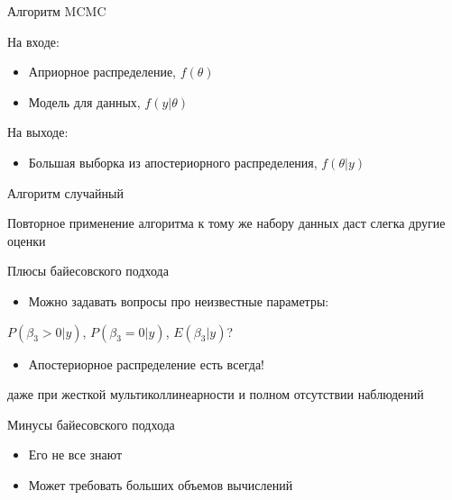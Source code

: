 \documentclass[ignorenonframetext,]{beamer}
\begin{document}
\begin{frame}{Алгоритм MCMC}

На входе:

\begin{itemize}
\item
  Априорное распределение, \(f(\theta)\)
\item
  Модель для данных, \(f(y|\theta)\)
\end{itemize}

На выходе:

\begin{itemize}
\itemsep1pt\parskip0pt
\item
  Большая выборка из апостериорного распределения, \(f(\theta|y)\)
\end{itemize}

\end{frame}

\begin{frame}{Алгоритм случайный}

Повторное применение алгоритма к тому же набору данных даст слегка
другие оценки

\end{frame}

\begin{frame}{Плюсы байесовского подхода}

\begin{itemize}
\itemsep1pt\parskip0pt
\item
  Можно задавать вопросы про неизвестные параметры:
\end{itemize}

\(P(\beta_3 >0 | y)\), \(P(\beta_3=0 | y)\), \(E(\beta_3 | y)\)?

\begin{itemize}
\itemsep1pt\parskip0pt
\item
  Апостериорное распределение есть всегда!
\end{itemize}

даже при жесткой мультиколлинеарности и полном отсутствии наблюдений

\end{frame}

\begin{frame}{Минусы байесовского подхода}

\begin{itemize}
\item
  Его не все знают
\item
  Может требовать больших объемов вычислений
\end{itemize}

\end{frame}
\end{document}
